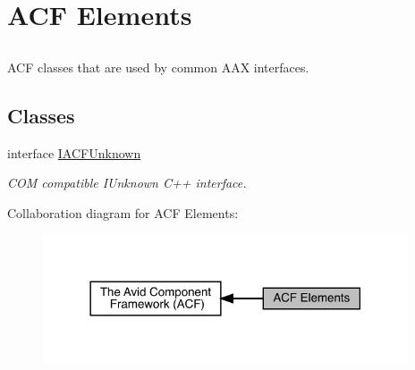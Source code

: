 \hypertarget{a00828}{}\section{A\+CF Elements}
\label{a00828}


\subsection{ }
A\+CF classes that are used by common A\+AX interfaces. 

\subsection*{Classes}
\begin{DoxyCompactItemize}
\item 
interface \mbox{\hyperlink{a01409}{I\+A\+C\+F\+Unknown}}
\begin{DoxyCompactList}\small\item\em C\+OM compatible I\+Unknown C++ interface. \end{DoxyCompactList}\end{DoxyCompactItemize}
Collaboration diagram for A\+CF Elements\+:
\nopagebreak
\begin{figure}[H]
\begin{center}
\leavevmode
\includegraphics[width=306pt]{a00828}
\end{center}
\end{figure}
